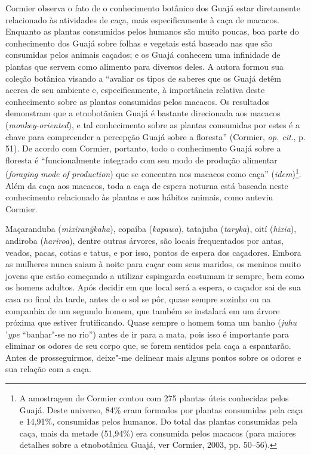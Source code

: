 Cormier observa o fato de o conhecimento botânico dos Guajá estar
diretamente relacionado às atividades de caça, mais especificamente à
caça de macacos. Enquanto as plantas consumidas pelos humanos são muito
poucas, boa parte do conhecimento dos Guajá sobre folhas e vegetais está
baseado nas que são consumidas pelos animais caçados; e os Guajá
conhecem uma infinidade de plantas que servem como alimento para
diversos deles. A autora formou sua coleção botânica visando a ``avaliar
os tipos de saberes que os Guajá detêm acerca de seu ambiente e,
especificamente, à importância relativa deste conhecimento sobre as
plantas consumidas pelos macacos. Os resultados demonstram que a
etnobotânica Guajá é bastante direcionada aos macacos
(\emph{monkey}-\emph{oriented}), e tal conhecimento sobre as plantas
consumidas por estes é a chave para compreender a percepção Guajá sobre
a floresta'' (Cormier, \emph{op. cit}., p. 51). De acordo com Cormier, portanto,
todo o conhecimento Guajá sobre a floresta é ``funcionalmente integrado
com seu modo de produção alimentar (\emph{foraging} \emph{mode}
\emph{of} \emph{production}) que se concentra nos macacos como caça''
(\emph{idem})\footnote{A amostragem de Cormier contou com 275 plantas úteis
  conhecidas pelos Guajá. Deste universo, 84\% eram formados por plantas
  consumidas pela caça e 14,91\%, consumidas pelos humanos. Do total das
  plantas consumidas pela caça, mais da metade (51,94\%) era consumida
  pelos macacos (para maiores detalhes sobre a etnobotânica Guajá, ver
  Cormier, 2003, pp. 50--56).}. Além da caça aos macacos, toda a caça de
espera noturna está baseada neste conhecimento relacionado às plantas e
aos hábitos animais, como anteviu Cormier.

Maçaranduba (\emph{mixiranỹkaha}), copaíba (\emph{kapawa}), tatajuba
(\emph{taryka}), oití (\emph{hixia}), andiroba (\emph{hariroa}), dentre
outras árvores, são locais frequentados por antas, veados, pacas, cotias
e tatus, e por isso, pontos de espera dos caçadores. Embora as mulheres
nunca saiam à noite para caçar com seus maridos, os meninos muito jovens
que estão começando a utilizar espingarda costumam ir sempre, bem como
os homens adultos. Após decidir em que local será a espera, o caçador
sai de sua casa no final da tarde, antes de o sol se pôr, quase sempre
sozinho ou na companhia de um segundo homem, que também se instalará em
um árvore próxima que estiver frutificando. Quase sempre o homem toma um
banho (\emph{juhu} '\emph{ype} ``banhar"-se no rio'') antes de ir para a
mata, pois isso é importante para eliminar os odores de seu corpo que,
se forem sentidos pela caça a espantarão. Antes de prosseguirmos,
deixe"-me delinear mais alguns pontos sobre os odores e sua relação com a
caça.

